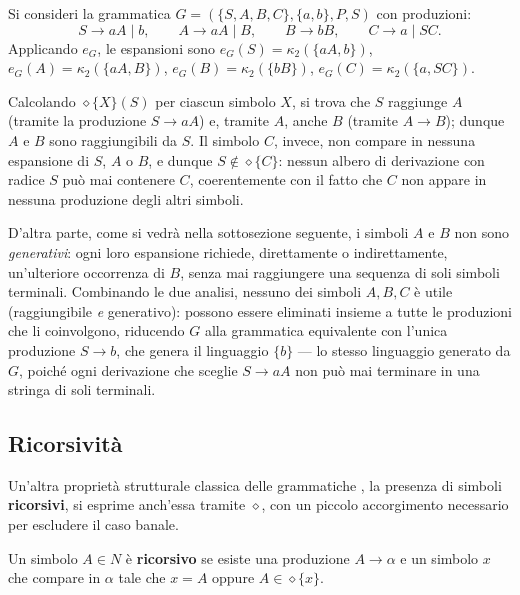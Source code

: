 \begin{example}
  Si consideri la grammatica \(G = (\{S, A, B, C\}, \{a, b\}, P, S)\) con produzioni:
  \[
    S \to aA \mid b, \qquad A \to aA \mid B, \qquad B \to bB, \qquad C \to a \mid SC.
  \]
  Applicando \(e_G\), le espansioni sono \(e_G(S) = \kappa_2(\{aA, b\})\), \(e_G(A) = \kappa_2(\{aA, B\})\), \(e_G(B) = \kappa_2(\{bB\})\), \(e_G(C) = \kappa_2(\{a, SC\})\).

  Calcolando \(\diamond\{X\}(S)\) per ciascun simbolo \(X\), si trova che \(S\) raggiunge \(A\) (tramite la produzione \(S \to aA\)) e, tramite \(A\), anche \(B\) (tramite \(A \to B\)); dunque \(A\) e \(B\) sono raggiungibili da \(S\). Il simbolo \(C\), invece, non compare in nessuna espansione di \(S\), \(A\) o \(B\), e dunque \(S \notin \diamond\{C\}\): nessun albero di derivazione con radice \(S\) può mai contenere \(C\), coerentemente con il fatto che \(C\) non appare in nessuna produzione degli altri simboli.

  D'altra parte, come si vedrà nella sottosezione seguente, i simboli \(A\) e \(B\) non sono \textit{generativi}: ogni loro espansione richiede, direttamente o indirettamente, un'ulteriore occorrenza di \(B\), senza mai raggiungere una sequenza di soli simboli terminali. Combinando le due analisi, nessuno dei simboli \(A, B, C\) è utile (raggiungibile \emph{e} generativo): possono essere eliminati insieme a tutte le produzioni che li coinvolgono, riducendo \(G\) alla grammatica equivalente con l'unica produzione \(S \to b\), che genera il linguaggio \(\{b\}\) — lo stesso linguaggio generato da \(G\), poiché ogni derivazione che sceglie \(S \to aA\) non può mai terminare in una stringa di soli terminali.
\end{example}

\subsection{Ricorsività}

Un'altra proprietà strutturale classica delle grammatiche \cite{hopcroft2006}, la presenza di simboli \textbf{ricorsivi}, si esprime anch'essa tramite \(\diamond\), con un piccolo accorgimento necessario per escludere il caso banale.

\begin{definition}
  Un simbolo \(A \in N\) è \textbf{ricorsivo} se esiste una produzione \(A \to \alpha\) e un simbolo \(x\) che compare in \(\alpha\) tale che \(x = A\) oppure \(A \in \diamond\{x\}\).
\end{definition}


